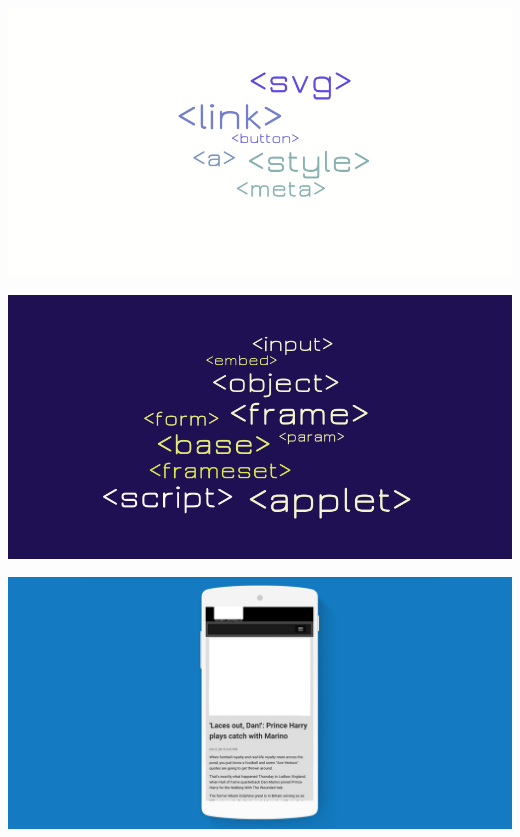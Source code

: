 \documentclass[graphic, aspectratio=169]{beamer}
\begin{document}
{\includegraphics[width=\paperwidth,height=\paperheight]{images/ok_tags.png}}
\begin{frame}
\end{frame}

{\includegraphics[width=\paperwidth,height=\paperheight]{images/deprecated_tags.png}}
\begin{frame}
\end{frame}

{\includegraphics[width=\paperwidth,height=\paperheight]{images/amp_example_without_images.jpg}}
\begin{frame}
\end{frame}
\end{document}
